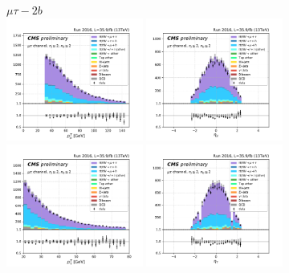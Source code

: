 \begin{figure}[ht]
    \centering
    $\mu\tau - 2b$ \\
    \includegraphics[width=0.4\textwidth]{chapters/Analysis/sectionPlots/figures/kinematics_pickles/mutau/2b/mutau_2b_lepton1_pt.pdf}
    \includegraphics[width=0.4\textwidth]{chapters/Analysis/sectionPlots/figures/kinematics_pickles/mutau/2b/mutau_2b_lepton1_eta.pdf}
    \includegraphics[width=0.4\textwidth]{chapters/Analysis/sectionPlots/figures/kinematics_pickles/mutau/2b/mutau_2b_lepton2_pt.pdf}
    \includegraphics[width=0.4\textwidth]{chapters/Analysis/sectionPlots/figures/kinematics_pickles/mutau/2b/mutau_2b_lepton2_eta.pdf}

\end{figure}
